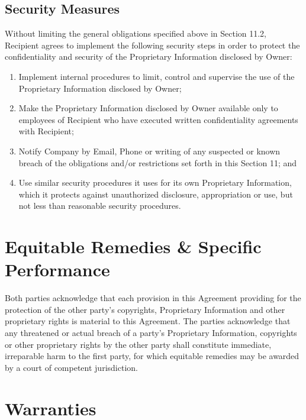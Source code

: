 \documentclass[letterpaper,10pt,english]{sphinxmanual}
\begin{document}
\section{Security Measures}
\label{\detokenize{nondisclosure:security-measures}}
Without limiting the general obligations specified above in
Section 11.2, Recipient agrees to implement the following security steps in order to protect the confidentiality and security of the Proprietary Information disclosed by Owner:
\begin{enumerate}
\item {} 
Implement internal procedures to limit, control and supervise the use of the Proprietary Information disclosed by Owner;

\item {} 
Make the Proprietary Information disclosed by Owner available only to employees of Recipient who have executed written confidentiality agreements with Recipient;

\item {} 
Notify Company by Email, Phone or writing of any suspected or known breach of the obligations and/or restrictions set forth in this Section 11; and

\item {} 
Use similar security procedures it uses for its own Proprietary Information, which it protects against unauthorized disclosure, appropriation or use, but not less than reasonable security procedures.

\end{enumerate}


\chapter{Equitable Remedies \& Specific Performance}
\label{\detokenize{remedyandperformance:equitable-remedies-specific-performance}}\label{\detokenize{remedyandperformance::doc}}
Both parties acknowledge that each provision in this Agreement providing for the protection of the other party’s copyrights, Proprietary Information and other proprietary rights is material to this Agreement. The parties acknowledge that any threatened or actual breach of a party’s Proprietary Information, copyrights or other proprietary rights by the other party shall constitute immediate, irreparable harm to the first party, for which equitable remedies may be awarded by a court of competent jurisdiction.


\chapter{Warranties}
\label{\detokenize{warranties:warranties}}\label{\detokenize{warranties::doc}}
\end{document}
